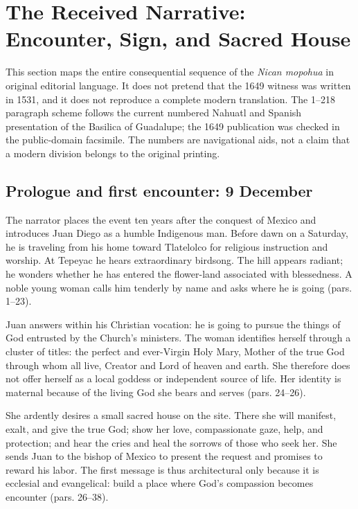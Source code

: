 \section{The Received Narrative: Encounter, Sign, and Sacred House}

This section maps the entire consequential sequence of the \emph{Nican mopohua} in original editorial language. It does not pretend that the 1649 witness was written in 1531, and it does not reproduce a complete modern translation. The 1--218 paragraph scheme follows the current numbered Nahuatl and Spanish presentation of the Basilica of Guadalupe; the 1649 publication was checked in the public-domain facsimile. The numbers are navigational aids, not a claim that a modern division belongs to the original printing.

\subsection{Prologue and first encounter: 9 December}

The narrator places the event ten years after the conquest of Mexico and introduces Juan Diego as a humble Indigenous man. Before dawn on a Saturday, he is traveling from his home toward Tlatelolco for religious instruction and worship. At Tepeyac he hears extraordinary birdsong. The hill appears radiant; he wonders whether he has entered the flower-land associated with blessedness. A noble young woman calls him tenderly by name and asks where he is going (pars. 1--23).

Juan answers within his Christian vocation: he is going to pursue the things of God entrusted by the Church's ministers. The woman identifies herself through a cluster of titles: the perfect and ever-Virgin Holy Mary, Mother of the true God through whom all live, Creator and Lord of heaven and earth. She therefore does not offer herself as a local goddess or independent source of life. Her identity is maternal because of the living God she bears and serves (pars. 24--26).

She ardently desires a small sacred house on the site. There she will manifest, exalt, and give the true God; show her love, compassionate gaze, help, and protection; and hear the cries and heal the sorrows of those who seek her. She sends Juan to the bishop of Mexico to present the request and promises to reward his labor. The first message is thus architectural only because it is ecclesial and evangelical: build a place where God's compassion becomes encounter (pars. 26--38).

